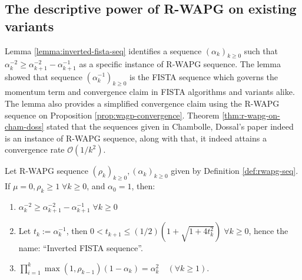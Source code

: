 \documentclass[12pt]{article}
\begin{document}
    \subsection{The descriptive power of R-WAPG on existing variants}\label{ssec:describe-variants-with-rwapg}
        Lemma \ref{lemma:inverted-fista-seq} identifies a sequence $(\alpha_k)_{k \ge 0}$ such that $\alpha_k^{-2} \ge \alpha_{k + 1}^{-2} - \alpha_{k + 1}^{-1}$ as a specific instance of R-WAPG sequence. 
        The lemma showed that sequence $(\alpha_k^{-1})_{k \ge 0}$ is the FISTA sequence which governs the momentum term and convergence claim in FISTA algorithms and variants alike. 
        The lemma also provides a simplified convergence claim using the R-WAPG sequence on Proposition \ref{prop:wagp-convergence}. 
        Theorem \ref{thm:r-wapg-on-cham-doss} stated that the sequences given in Chambolle, Dossal's
        paper \cite{chambolle_convergence_2015} indeed is an instance of R-WAPG sequence, along with that, it indeed attains a convergence rate $\mathcal O(1/k^2)$. 
        \par 
        \begin{lemma}\label{lemma:inverted-fista-seq}
            Let R-WAPG sequence $(\rho_k)_{k \ge 0}, (\alpha_k)_{k \ge 0}$ given by Definition \ref{def:rwapg-seq}. 
            If $\mu = 0, \rho_k \ge 1\; \forall k \ge 0$, and $\alpha_0 = 1$, then: 
            \begin{enumerate}
                \item $\alpha_k^{-2} \ge \alpha_{k + 1}^{-2} - \alpha_{k + 1}^{-1}\; \forall k \ge 0$
                \item Let $t_k := \alpha_k^{-1}$, then $0 < t_{k + 1} \le (1/2)\left(1 + \sqrt{1 + 4t_k^2}\right)\;\forall k\ge 0$, hence the name: ``Inverted FISTA sequence''. 
                \item $\prod_{i = 1}^k\max(1, \rho_{k - 1})(1 - \alpha_k) = \alpha_k^2 \quad (\forall k \ge 1)$. 
            \end{enumerate}
        \end{lemma}
\end{document}
